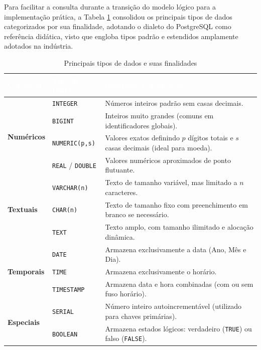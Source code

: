 Para facilitar a consulta durante a transição do modelo lógico para a implementação prática, a Tabela \ref{tab:tipos_dados} consolidou os principais tipos de dados categorizados por sua finalidade, adotando o dialeto do PostgreSQL como referência didática, visto que engloba tipos padrão e estendidos amplamente adotados na indústria.

\begin{table}[htpb]
\centering
\caption{Principais tipos de dados e suas finalidades}
\label{tab:tipos_dados}
\renewcommand{\arraystretch}{1.3}
\begin{tabular}{|p{2.5cm}|p{3.5cm}|p{8cm}|}
\hline
\rowcolor{verdeuni}
\textbf{\textcolor{white}{Categoria}} & \textbf{\textcolor{white}{Tipo de Dado}} & \textbf{\textcolor{white}{Descrição e Aplicação}} \\ \hline
\multirow{4}{*}{\textbf{Numéricos}} 
& \texttt{INTEGER} & Números inteiros padrão sem casas decimais. \\ \cline{2-3}
& \texttt{BIGINT} & Inteiros muito grandes (comuns em identificadores globais). \\ \cline{2-3}
& \texttt{NUMERIC(p,s)} & Valores exatos definindo $p$ dígitos totais e $s$ casas decimais (ideal para moeda). \\ \cline{2-3}
& \texttt{REAL} / \texttt{DOUBLE} & Valores numéricos aproximados de ponto flutuante. \\ \hline
\multirow{3}{*}{\textbf{Textuais}} 
& \texttt{VARCHAR(n)} & Texto de tamanho variável, mas limitado a $n$ caracteres. \\ \cline{2-3}
& \texttt{CHAR(n)} & Texto de tamanho fixo com preenchimento em branco se necessário. \\ \cline{2-3}
& \texttt{TEXT} & Texto amplo, com tamanho ilimitado e alocação dinâmica. \\ \hline
\multirow{3}{*}{\textbf{Temporais}} 
& \texttt{DATE} & Armazena exclusivamente a data (Ano, Mês e Dia). \\ \cline{2-3}
& \texttt{TIME} & Armazena exclusivamente o horário. \\ \cline{2-3}
& \texttt{TIMESTAMP} & Armazena data e hora combinadas (com ou sem fuso horário). \\ \hline
\multirow{2}{*}{\textbf{Especiais}} 
& \texttt{SERIAL} & Número inteiro autoincrementável (utilizado para chaves primárias). \\ \cline{2-3}
& \texttt{BOOLEAN} & Armazena estados lógicos: verdadeiro (\texttt{TRUE}) ou falso (\texttt{FALSE}). \\ \hline
\end{tabular}
\end{table}

